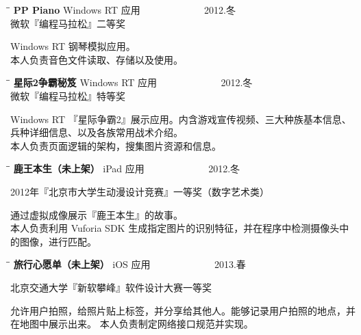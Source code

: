\documentclass{res}
\begin{document}
\begin{resume}
    \begin{tabbing}
      \hspace{2.3in}\= \hspace{2.6in}\= \kill %
      {\bf PP Piano} \> Windows RT 应用 \> ~~~~~~~~~~~~ 2012.冬\\
                          \>微软『编程马拉松』二等奖
    \end{tabbing}\vspace{-20pt}
    Windows RT 钢琴模拟应用。\\
    本人负责音色文件读取、存储以及使用。

    \begin{tabbing}
      \hspace{2.3in}\= \hspace{2.6in}\= \kill %
      {\bf 星际2争霸秘笈}  \>Windows RT 应用\> ~~~~~~~~~~~~ 2012.冬\\
                          \>微软『编程马拉松』特等奖
    \end{tabbing}\vspace{-20pt}
    Windows RT 『星际争霸2』展示应用。内含游戏宣传视频、三大种族基本信息、兵种详细信息、以及各族常用战术介绍。\\
    本人负责页面逻辑的架构，搜集图片资源和信息。

    \begin{tabbing}
      \hspace{2.3in}\= \hspace{2.6in}\= \kill %
      {\bf 鹿王本生（未上架）}  \> iPad 应用 \> ~~~~~~~~~~~~ 2012.冬\\
                          \centerline{2012年『北京市大学生动漫设计竞赛』一等奖（数字艺术类）}
    \end{tabbing}\vspace{-20pt}
    通过虚拟成像展示『鹿王本生』的故事。  \\
    本人负责利用 Vuforia SDK 生成指定图片的识别特征，并在程序中检测摄像头中的图像，进行匹配。

    \begin{tabbing}
      \hspace{2.3in}\= \hspace{2.6in}\= \kill %
      {\bf 旅行心愿单（未上架）} \>  iOS 应用  \> ~~~~~~~~~~~~ 2013.春\\
                          \centerline{北京交通大学『新软攀峰』软件设计大赛一等奖}
    \end{tabbing}\vspace{-20pt}      %
    允许用户拍照，给照片贴上标签，并分享给其他人。能够记录用户拍照的地点，并在地图中展示出来。
    本人负责制定网络接口规范并实现。


\end{resume}
\end{document}
